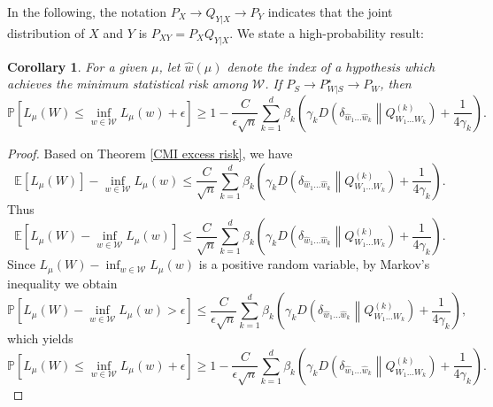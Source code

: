\documentclass{article}
\newtheorem{corollary}{Corollary}
\newcommand{\pr}{\mathbb{P}}
\newcommand{\E}{\mathbb{E}}
\newcommand{\W}[0]{\mathcal{W}}
\begin{document}
In the following, the notation $P_X\to Q_{Y|X}\to P_Y$ indicates that the joint distribution of $X$ and $Y$ is $P_{XY}=P_XQ_{Y|X}$. We state a high-probability result:
\begin{corollary}
    For a given $\mu$, let $\widehat{w}(\mu)$ denote the index of a hypothesis which achieves the minimum statistical risk among $\W$. If $P_S\to P_{W|S}^{\star}\to P_W$, then
\begin{equation}
	\pr\left[L_{\mu}(W)\leq\inf_{w\in\W}L_{\mu}(w)+ \epsilon\right]\geq 1-\frac{C}{\epsilon\sqrt{n}}\sum_{k=1}^d \beta_k\left(\gamma_k D\left(\delta_{\widehat{w}_1 \dots \widehat{w}_k}\middle\|Q^{(k)}_{W_1\dots W_k}\right)+\frac{1}{4\gamma_k}\right). \label{high probability ineq}
\end{equation}
\end{corollary} 
\begin{proof} 
Based on Theorem \ref{CMI excess risk}, we have
\begin{equation}
	\E[L_{\mu}(W)]-\inf_{w\in\W} L_{\mu}(w)\leq \frac{C}{\sqrt{n}}\sum_{k=1}^d \beta_k\left(\gamma_k D\left(\delta_{\widehat{w}_1 \dots \widehat{w}_k}\middle\|Q^{(k)}_{W_1\dots W_k}\right)+\frac{1}{4\gamma_k}\right). \nonumber
\end{equation}
Thus
\begin{equation}
	\E\left[L_{\mu}(W)-\inf_{w\in\W} L_{\mu}(w)\right]\leq \frac{C}{\sqrt{n}}\sum_{k=1}^d \beta_k\left(\gamma_k D\left(\delta_{\widehat{w}_1 \dots \widehat{w}_k}\middle\|Q^{(k)}_{W_1\dots W_k}\right)+\frac{1}{4\gamma_k}\right).\nonumber
\end{equation}
Since $L_{\mu}(W)-\inf_{w\in\W} L_{\mu}(w)$ is a positive random variable, by Markov's inequality we obtain
\begin{equation}
	\pr\left[L_{\mu}(W)-\inf_{w\in\W}L_{\mu}(w)> \epsilon\right]	\leq\frac{C}{\epsilon\sqrt{n}}\sum_{k=1}^d \beta_k\left(\gamma_k D\left(\delta_{\widehat{w}_1 \dots \widehat{w}_k}\middle\|Q^{(k)}_{W_1\dots W_k}\right)+\frac{1}{4\gamma_k}\right), \nonumber
\end{equation}
which yields
\begin{equation}
	\pr\left[L_{\mu}(W)\leq\inf_{w\in\W}L_{\mu}(w)+ \epsilon\right]\geq 1-\frac{C}{\epsilon\sqrt{n}}\sum_{k=1}^d \beta_k\left(\gamma_k D\left(\delta_{\widehat{w}_1 \dots \widehat{w}_k}\middle\|Q^{(k)}_{W_1\dots W_k}\right)+\frac{1}{4\gamma_k}\right).\nonumber
\end{equation}
\end{proof}
\end{document}
